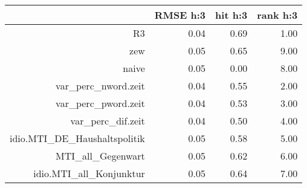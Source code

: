 \begin{table}[ht]
\centering
\begin{tabular}{rrrr}
  \hline
 & RMSE h:3 & hit h:3 & rank h:3 \\ 
  \hline
R3 & 0.04 & 0.69 & 1.00 \\ 
  zew & 0.05 & 0.65 & 9.00 \\ 
  naive & 0.05 & 0.00 & 8.00 \\ 
  var\_perc\_nword.zeit & 0.04 & 0.55 & 2.00 \\ 
  var\_perc\_pword.zeit & 0.04 & 0.53 & 3.00 \\ 
  var\_perc\_dif.zeit & 0.04 & 0.50 & 4.00 \\ 
  idio.MTI\_DE\_Haushaltspolitik & 0.05 & 0.58 & 5.00 \\ 
  MTI\_all\_Gegenwart & 0.05 & 0.62 & 6.00 \\ 
  idio.MTI\_all\_Konjunktur & 0.05 & 0.64 & 7.00 \\ 
   \hline
\end{tabular}
\end{table}

